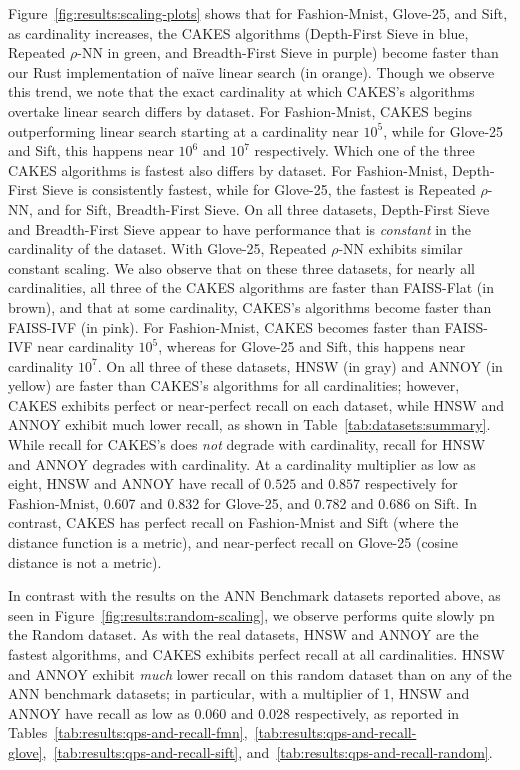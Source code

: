 Figure~\ref{fig:results:scaling-plots} shows that for Fashion-Mnist, Glove-25, and Sift, as cardinality increases, the CAKES algorithms (Depth-First Sieve in blue, Repeated $\rho$-NN in green, and Breadth-First Sieve in purple) become faster than our Rust implementation of na\"{i}ve linear search (in orange).
Though we observe this trend, we note that the exact cardinality at which CAKES's algorithms overtake linear search differs by dataset. For Fashion-Mnist, CAKES begins outperforming linear search starting at a cardinality near $10^5$, while for Glove-25 and Sift, this happens near $10^6$ and $10^7$ respectively.
Which one of the three CAKES algorithms is fastest also differs by dataset.
For Fashion-Mnist, Depth-First Sieve is consistently fastest, while for Glove-25, the fastest is Repeated $\rho$-NN, and for Sift, Breadth-First Sieve.
On all three datasets, Depth-First Sieve and Breadth-First Sieve appear to have performance that is \textit{constant} in the cardinality of the dataset.
With Glove-25, Repeated $\rho$-NN exhibits similar constant scaling.
We also observe that on these three datasets, for nearly all cardinalities, all three of the CAKES algorithms are faster than FAISS-Flat (in brown), and that at some cardinality, CAKES's algorithms become faster than FAISS-IVF (in pink).
For Fashion-Mnist, CAKES becomes faster than FAISS-IVF near cardinality $10^5$, whereas for Glove-25 and Sift, this happens near cardinality $10^7$.
On all three of these datasets, HNSW (in gray) and ANNOY (in yellow) are faster than CAKES's algorithms for all cardinalities; however, CAKES exhibits perfect or near-perfect recall on each dataset, while HNSW and ANNOY exhibit much lower recall, as shown in Table~\ref{tab:datasets:summary}.
While recall for CAKES's does \emph{not} degrade with cardinality, recall for HNSW and ANNOY degrades with cardinality.
At a cardinality multiplier as low as eight, HNSW and ANNOY have recall of $0.525$ and $0.857$ respectively for Fashion-Mnist, 0.607 and 0.832 for Glove-25, and 0.782 and 0.686 on Sift.
In contrast, CAKES has perfect recall on Fashion-Mnist and Sift (where the distance function is a metric), and near-perfect recall on Glove-25 (cosine distance is not a metric).


In contrast with the results on the ANN Benchmark datasets reported above, as seen in Figure~\ref{fig:results:random-scaling}, we observe performs quite slowly pn the Random dataset.
As with the real datasets, HNSW and ANNOY are the fastest algorithms, and CAKES exhibits perfect recall at all cardinalities.
HNSW and ANNOY exhibit \textit{much} lower recall on this random dataset than on any of the ANN benchmark datasets;
in particular, with a multiplier of 1, HNSW and ANNOY have recall as low as 0.060 and 0.028 respectively, as reported in Tables~\ref{tab:results:qps-and-recall-fmn},~\ref{tab:results:qps-and-recall-glove},~\ref{tab:results:qps-and-recall-sift}, and~\ref{tab:results:qps-and-recall-random}.

